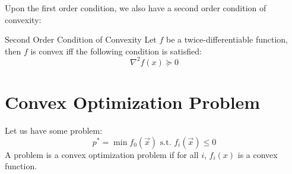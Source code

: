 Upon the first order condition, we also have a second order condition of convexity:
\begin{ln-define}{Second Order Condition of Convexity}{}
    Let $f$ be a twice-differentiable function, then $f$ is convex iff the following condition is satisfied:
    \[
        \nabla^2 f(x) \succcurlyeq 0
    \]
\end{ln-define}

\section{Convex Optimization Problem}
Let us have some problem:
\[
    p^* = \min f_0(\vec{x}) \text{ s.t. } f_i(\vec{x}) \leq 0
\]
A problem is a convex optimization problem if for all $i$, $f_i(x)$ is a convex function.
